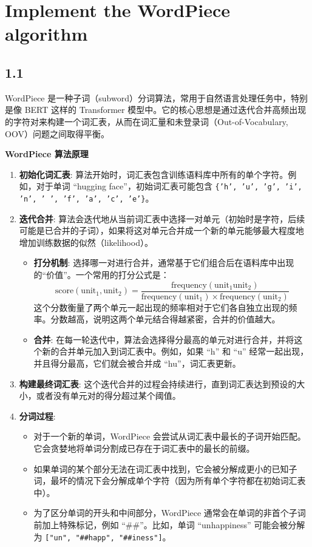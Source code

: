 \documentclass[12pt,letterpaper]{article}
\begin{document}
\section{Implement the WordPiece algorithm}
\subsection*{1.1}
WordPiece 是一种子词（subword）分词算法，常用于自然语言处理任务中，特别是像 BERT 这样的 Transformer 模型中。它的核心思想是通过迭代合并高频出现的字符对来构建一个词汇表，从而在词汇量和未登录词（Out-of-Vocabulary, OOV）问题之间取得平衡。

\vspace{\baselineskip} %
\noindent\textbf{WordPiece 算法原理}
\begin{enumerate}
    \item \textbf{初始化词汇表}: 算法开始时，词汇表包含训练语料库中所有的单个字符。例如，对于单词 ``hugging face''，初始词汇表可能包含 \texttt{\{'h', 'u', 'g', 'i', 'n', ' ', 'f', 'a', 'c', 'e'\}}。

    \item \textbf{迭代合并}: 算法会迭代地从当前词汇表中选择一对单元（初始时是字符，后续可能是已合并的子词），如果将这对单元合并成一个新的单元能够最大程度地增加训练数据的似然（likelihood）。
    \begin{itemize}
        \item \textbf{打分机制}: 选择哪一对进行合并，通常基于它们组合后在语料库中出现的“价值”。一个常用的打分公式是：
        $$ \text{score}(\text{unit}_1, \text{unit}_2) = \frac{\text{frequency}(\text{unit}_1\text{unit}_2)}{\text{frequency}(\text{unit}_1) \times \text{frequency}(\text{unit}_2)} $$
        这个分数衡量了两个单元一起出现的频率相对于它们各自独立出现的频率。分数越高，说明这两个单元结合得越紧密，合并的价值越大。
        \item \textbf{合并}: 在每一轮迭代中，算法会选择得分最高的单元对进行合并，并将这个新的合并单元加入到词汇表中。例如，如果 ``h'' 和 ``u'' 经常一起出现，并且得分最高，它们就会被合并成 ``hu''，词汇表更新。
    \end{itemize}

    \item \textbf{构建最终词汇表}: 这个迭代合并的过程会持续进行，直到词汇表达到预设的大小，或者没有单元对的得分超过某个阈值。

    \item \textbf{分词过程}:
    \begin{itemize}
        \item 对于一个新的单词，WordPiece 会尝试从词汇表中最长的子词开始匹配。它会贪婪地将单词分割成已存在于词汇表中的最长的前缀。
        \item 如果单词的某个部分无法在词汇表中找到，它会被分解成更小的已知子词，最坏的情况下会分解成单个字符（因为所有单个字符都在初始词汇表中）。
        \item 为了区分单词的开头和中间部分，WordPiece 通常会在单词的非首个子词前加上特殊标记，例如 ``\#\#''。比如，单词 ``unhappiness'' 可能会被分解为 \texttt{["un", "\#\#happ", "\#\#iness"]}。
    \end{itemize}
\end{enumerate}
\end{document}
